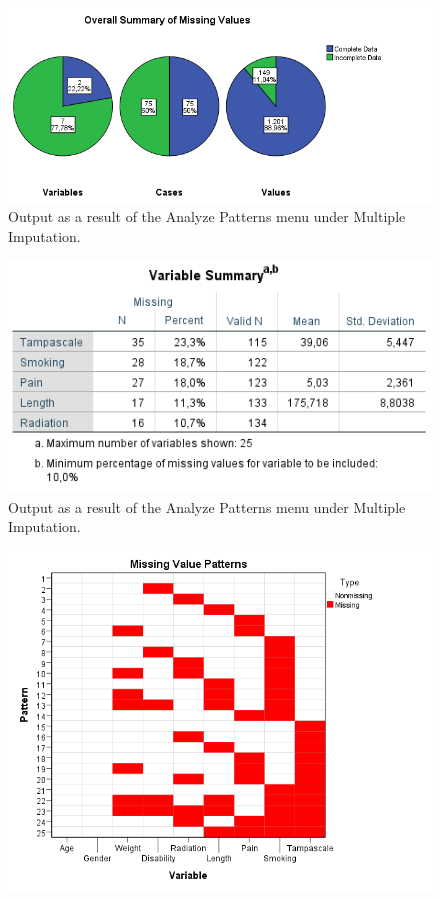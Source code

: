\documentclass[]{book}
\theoremstyle{definition}
\theoremstyle{definition}
\theoremstyle{definition}
\theoremstyle{remark}
\begin{document}
\begin{figure}

{\centering \includegraphics[width=0.9\linewidth]{images/fig2.6a} 

}

\caption{Output as a result of the Analyze Patterns menu under Multiple Imputation.}\label{fig:fig2-6}
\end{figure}\begin{figure}

{\centering \includegraphics[width=0.9\linewidth]{images/fig2.6b} 

}

\caption{Output as a result of the Analyze Patterns menu under Multiple Imputation.}\label{fig:fig2-6}
\end{figure}\begin{figure}

{\centering \includegraphics[width=0.9\linewidth]{images/fig2.6c} 

}
\end{figure}
\end{document}
